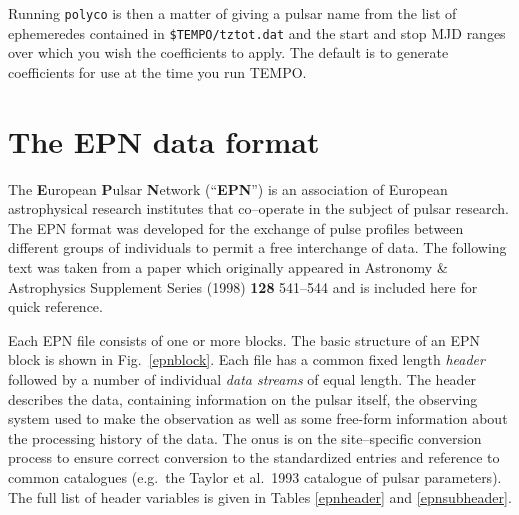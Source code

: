 \documentclass[11pt]{article}
\begin{document}
Running {\tt polyco} is then a matter of giving a pulsar name
from the list of ephemeredes contained in \verb+$TEMPO/tztot.dat+
and the start and stop MJD ranges over which you wish the 
coefficients to apply. The default is to generate coefficients
for use at the time you run {\sc TEMPO}.

\section{The EPN data format}
\label{epn}
The {\bf E}uropean {\bf P}ulsar {\bf N}etwork (``{\bf EPN}'') is an
association of European astrophysical research institutes that
co--operate in the subject of pulsar research. The EPN format
was developed for the exchange of pulse profiles between different
groups of individuals to permit a free interchange of data.
The following text was taken from a paper which originally
appeared in Astronomy \& Astrophysics Supplement Series  (1998)
{\bf 128} 541--544 and is included here for quick reference.

Each EPN file consists of one or more blocks.  The basic structure
of an EPN block is shown in Fig.~\ref{epnblock}.  
Each file has a common fixed
length {\it header} followed by a number of individual {\it data
streams} of equal length. The header describes the data, containing
information on the pulsar itself, the observing system used to make
the observation as well as some free-form information about the
processing history of the data. The onus is on the site--specific
conversion process to ensure correct conversion to the standardized
entries and reference to common catalogues (e.g.~the Taylor et al.~1993
catalogue of pulsar
parameters).  The full list of header variables is given in Tables 
\ref{epnheader} and \ref{epnsubheader}.
\end{document}
